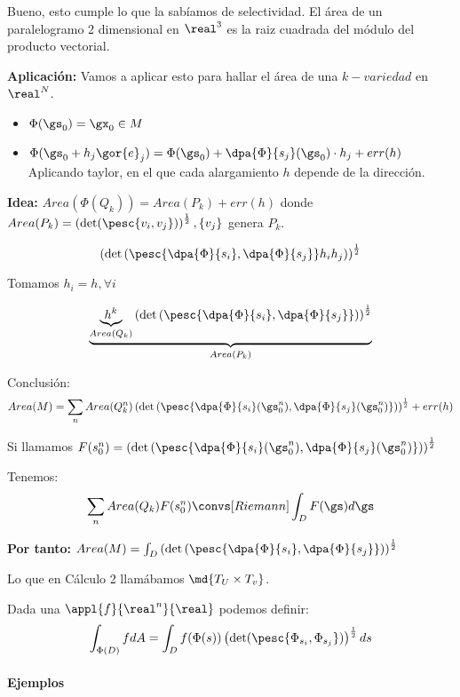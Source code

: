Bueno, esto cumple lo que la sabíamos de selectividad. El área de un paralelogramo 2 dimensional en $\real^3$ es la raiz cuadrada del módulo del producto vectorial.

\textbf{Aplicación:} Vamos a aplicar esto para hallar el área de una $k-variedad$ en $\real^N$.

\begin{itemize}
\item $\Phi(\gs_0) = \gx_0 \in M$
\item $\Phi(\gs_0 + h_j\gor{e}_j) = \Phi(\gs_0) + \dpa{\Phi}{s_j}(\gs_0)\cdot h_j + err(h)$
Aplicando taylor, en el que cada alargamiento $h$ depende de la dirección.
\end{itemize}

\textbf{Idea:} $Area(\Phi(Q_k)) = Area(P_k) + err(h)$ donde $Area(P_k) = \left(\det (\pesc{v_i,v_j})\right)^{\frac{1}{2}}, \{v_j\}$ genera $P_k$.


\[\left(\det\left(\pesc{\dpa{\Phi}{s_i},\dpa{\Phi}{s_j}}h_ih_j\right)\right)^{\frac{1}{2}}\]

Tomamos $h_i = h, \forall i$

\[\underbrace{\underbrace{h^k}_{Area(Q_k)} \left(\det\left(\pesc{\dpa{\Phi}{s_i},\dpa{\Phi}{s_j}}\right)\right)^{\frac{1}{2}}}_{Area(P_k)}\]

Conclusión: \[Area(M) = \sum_n Area(Q_k^n) \left(\det\left(\pesc{\dpa{\Phi}{s_i}(\gs_0^n),\dpa{\Phi}{s_j}(\gs_0^n)}\right)\right)^{\frac{1}{2}} + err(h)\]

Si llamamos $F(s_0^n) = \left(\det\left(\pesc{\dpa{\Phi}{s_i}(\gs_0^n),\dpa{\Phi}{s_j}(\gs_0^n)}\right)\right)^{\frac{1}{2}}$ 

Tenemos: \[\sum_n Area(Q_k) F(s_0^n) \convs[Riemann] \int_D F(\gs)d\gs\]

\textbf{Por tanto:} $Area(M) = \int_D \left(\det\left(\pesc{\dpa{\Phi}{s_i},\dpa{\Phi}{s_j}}\right)\right)^{\frac{1}{2}}$

Lo que en Cálculo 2 llamábamos $\md{T_U\times T_v}$.


Dada una $\appl{f}{\real^n}{\real}$ podemos definir: \[\int_{\Phi(D)}f dA = \int_{D}f(\Phi(s)) \left(\det(\pesc{\Phi_{s_i},\Phi_{s_j}})\right)^{\frac{1}{2}} ds\]

\paragraph{Ejemplos}


